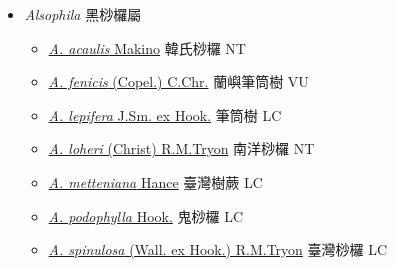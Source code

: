 
  \begin{itemize}
 \item[    ] \textit{Alsophila} 黑桫欏屬
                                
  \begin{itemize}
        \item[] \href{http://www.theplantlist.org/tpl1.1/search?q=Alsophila+acaulis}{\textit{A. acaulis} Makino}   韓氏桫欏   NT
        \item[] \href{http://www.theplantlist.org/tpl1.1/search?q=Alsophila+fenicis}{\textit{A. fenicis} (Copel.) C.Chr.}   蘭嶼筆筒樹   VU
        \item[] \href{http://www.theplantlist.org/tpl1.1/search?q=Alsophila+lepifera}{\textit{A. lepifera} J.Sm. ex Hook.}   筆筒樹   LC
        \item[] \href{http://www.theplantlist.org/tpl1.1/search?q=Alsophila+loheri}{\textit{A. loheri} (Christ) R.M.Tryon}   南洋桫欏   NT
        \item[] \href{http://www.theplantlist.org/tpl1.1/search?q=Alsophila+metteniana}{\textit{A. metteniana} Hance}   臺灣樹蕨   LC
        \item[] \href{http://www.theplantlist.org/tpl1.1/search?q=Alsophila+podophylla}{\textit{A. podophylla} Hook.}   鬼桫欏   LC
        \item[] \href{http://www.theplantlist.org/tpl1.1/search?q=Alsophila+spinulosa}{\textit{A. spinulosa} (Wall. ex Hook.) R.M.Tryon}   臺灣桫欏   LC
  \end{itemize}
  \end{itemize}
